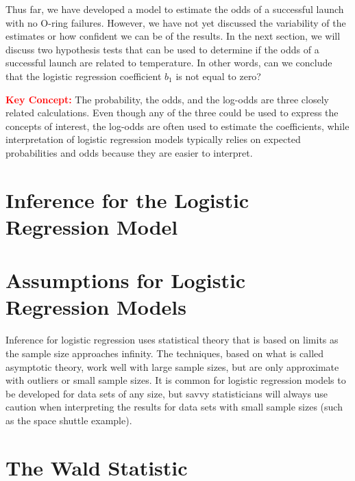 \documentclass[
]{report}
\begin{document}
Thus far, we have developed a model to estimate the odds of a successful launch with no O-ring failures. However, we have not yet discussed the variability of the estimates or how confident we can be of the results. In the next section, we will discuss two hypothesis tests that can be used to determine if the odds of a successful launch are related to temperature. In other words, can we conclude that the logistic regression coefficient \(b_1\) is not equal to zero?

\Large

\textbf{\textcolor{red}{Key Concept:}}
\color{red}
The probability, the odds, and the log-odds are three closely related calculations. Even though any of
the three could be used to express the concepts of interest, the log-odds are often used to estimate the
coefficients, while interpretation of logistic regression models typically relies on expected probabilities
and odds because they are easier to interpret.
\color{black}
\normalsize

\hypertarget{inference-for-the-logistic-regression-model-1}{%
\section{\texorpdfstring{\textbf{Inference for the Logistic Regression Model}}{Inference for the Logistic Regression Model}}\label{inference-for-the-logistic-regression-model-1}}

\hypertarget{assumptions-for-logistic-regression-models-1}{%
\section*{Assumptions for Logistic Regression Models}\label{assumptions-for-logistic-regression-models-1}}

Inference for logistic regression uses statistical theory that is based on limits as the sample size approaches infinity. The techniques, based on what is called asymptotic theory, work well with large sample sizes, but are only approximate with outliers or small sample sizes. It is common for logistic regression models to be developed for data sets of any size, but savvy statisticians will always use caution when interpreting the results for data sets with small sample sizes (such as the space shuttle example).

\hypertarget{the-wald-statistic-1}{%
\section*{The Wald Statistic}\label{the-wald-statistic-1}}
\end{document}
